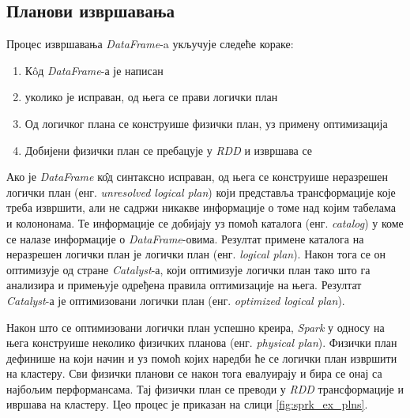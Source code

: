 \documentclass[12pt,oneside]{memoir}
\begin{document}
\subsection{Планови извршавања}
\label{subsec:spark_exec_plans}

Процес извршавања \textit{DataFrame}-a укључује следеће кораке:
\begin{enumerate}
\item К\^{o}д \textit{DataFrame}-а је написан
\item уколико је исправан, од њега се прави логички план
\item Од логичког плана се конструише физички план, уз примену оптимизација
\item Добијени физички план се пребацује у \textit{RDD} и извршава се
\end{enumerate}

Ако је \textit{DataFrame} к\^{о}д синтаксно исправан, од њега се конструише неразрешен логички план (енг. \textit{unresolved logical plan}) који представља трансформације које треба извршити, али не садржи никакве информације о томе над којим табелама и колононама. Те информације се добијају уз помоћ каталога (енг. \textit{catalog}) у коме се налазе информације о \textit{DataFrame}-овима. Резултат примене каталога на неразрешен логички план је логички план (енг. \textit{logical plan}). Након тога се он оптимизује од стране \textit{Catalyst}-а, који оптимизује логички план тако што га анализира и примењује одређена правила оптимизације на њега.  Резултат \textit{Catalyst}-а је оптимизовани логички план (енг. \textit{optimized logical plan}). \cite{spark_guide}



Након што се оптимизовани логички план успешно креира, \textit{Spark} у односу на њега конструише неколико физичких планова (енг. \textit{physical plan}). Физички план дефинише на који начин и уз помоћ којих наредби ће се логички план извршити на кластеру. Сви физички планови се након тога евалуирају и бира се онај са најбољим перформансама. Тај физички план се преводи у \textit{RDD} трансформације и ивршава на кластеру. Цео процес је приказан на слици \ref{fig:sprk_ex_plns}. \cite{spark_guide}
\end{document}
